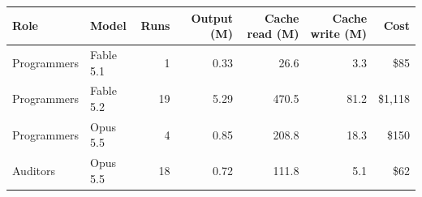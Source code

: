 \begin{tabular}{llrrrrr}
\toprule
Role & Model & Runs & Output (M) & Cache read (M) & Cache write (M) & Cost \\
\midrule
Programmers & Fable 5.1 & 1 & 0.33 & 26.6 & 3.3 & \$85 \\
Programmers & Fable 5.2 & 19 & 5.29 & 470.5 & 81.2 & \$1,118 \\
Programmers & Opus 5.5 & 4 & 0.85 & 208.8 & 18.3 & \$150 \\
Auditors & Opus 5.5 & 18 & 0.72 & 111.8 & 5.1 & \$62 \\
\bottomrule
\end{tabular}
